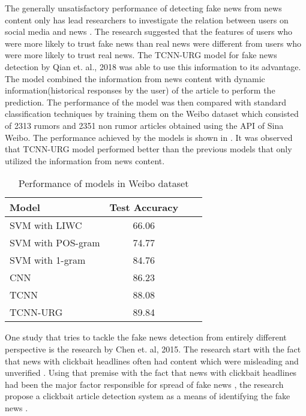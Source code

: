 The generally unsatisfactory performance of detecting fake news from news content only has lead researchers to investigate the relation between users on social media and news \cite{shu2018understanding}. The research suggested that the features of users who were more likely to trust fake news than real news were different from users who were more likely to trust real news. The TCNN-URG model for fake news detection by Qian et. al., 2018 was able to use this information to its advantage. The model combined the information from news content with dynamic information(historical responses by the user) of the article to perform the prediction. The performance of the model was then compared with standard classification techniques by training them on the Weibo dataset\cite{ma2016detecting} which consisted of 2313 rumors and 2351 non rumor articles obtained using the API of Sina Weibo. The performance achieved by the models is shown in  \cite{qian2018neural}. It was observed that TCNN-URG model performed better than the previous models that only utilized the information from news content.

\begin{table}[h]
\begin{center}
\caption{Performance of models in Weibo dataset}
\label{tbl:weibo_performance}
\begin{tabular}{lccc}
\toprule 
\rule[-1pt]{0pt}{14pt}Model&Test Accuracy\\
\midrule 
SVM with LIWC&66.06\\
SVM with POS-gram&74.77\\
SVM with 1-gram&84.76\\
CNN&86.23\\
TCNN&88.08\\
TCNN-URG&89.84\\
\bottomrule
\end{tabular}
\end{center}
\end{table}

One study that tries to tackle the fake news detection from entirely different perspective is the research by Chen et. al, 2015.  The research start with the fact that news with clickbait headlines often had content which were misleading and unverified \cite{silverman2016analysis}. Using that premise with the fact that news with clickbait headlines had been the major factor responsible for spread of fake news \cite{silverman2015lies}, the research propose a clickbait article detection system as a means of identifying the fake news \cite{chen2015misleading}.